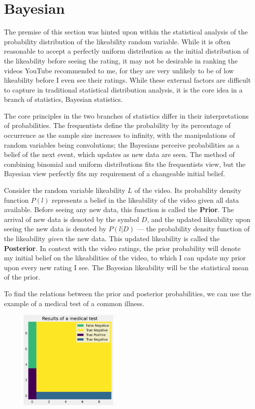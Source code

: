 \documentclass[a4paper,11pt]{article}
\begin{document}
\section{Bayesian}

The premise of this section was hinted upon within the statistical analysis of the probability distribution of the likeability random variable. While it is often reasonable to accept a perfectly uniform distribution as the initial distribution of the likeability before seeing the rating, it may not be desirable in ranking the videos YouTube recommended to me, for they are very unlikely to be of low likeability before I even see their ratings. While these external factors are difficult to capture in traditional statistical distribution analysis, it is the core idea in a branch of statistics, Bayesian statistics.

The core principles in the two branches of statistics differ in their interpretations of probabilities. The frequentists define the probability by its percentage of occurrence as the sample size increases to infinity, with the manipulations of random variables being convolutions; the Bayesians perceive probabilities as a belief of the next event, which updates as new data are seen. The method of combining binomial and uniform distributions fits the frequentists view, but the Bayesian view perfectly fits my requirement of a changeable initial belief.

Consider the random variable likeability $L$ of the video. Its probability density function $P(l)$ represents a belief in the likeability of the video given all data available. Before seeing any new data, this function is called the \textbf{Prior}. The arrival of new data is denoted by the symbol $D$, and the updated likeability upon seeing the new data is denoted by $P(l | D)$ --- the probability density function of the likeability \textit{given} the new data. This updated likeability is called the \textbf{Posterior}. In context with the video ratings, the prior probability will denote my initial belief on the likeabilities of the video, to which I can update my prior upon every new rating I see. The Bayesian likeability will be the statistical mean of the prior.

To find the relations between the prior and posterior probabilities, we can use the example of a medical test of a common illness.

\begin{figure}
    \includegraphics[width=0.43\textwidth,right]{assets/medical_scenario.png}
    \caption{}
    \label{fig:medical}
\end{figure}
\end{document}
